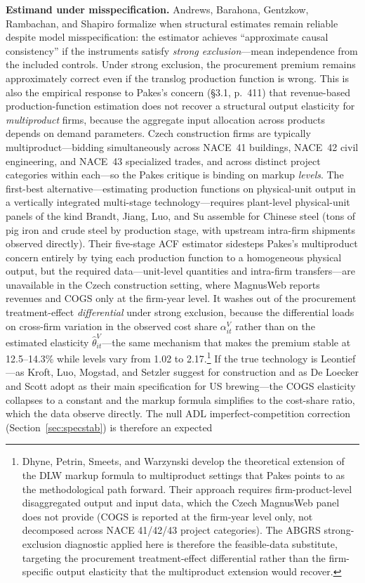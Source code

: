 \documentclass[11pt]{article}
\begin{document}
\textbf{Estimand under misspecification.} Andrews, Barahona, Gentzkow, Rambachan, and Shapiro \cite{ABGRS2025} formalize when structural estimates remain reliable despite model misspecification: the estimator achieves ``approximate causal consistency'' if the instruments satisfy \emph{strong exclusion}---mean independence from the included controls. Under strong exclusion, the procurement premium remains approximately correct even if the translog production function is wrong. This is also the empirical response to Pakes's \cite{Pakes2021AnnRev} concern (\S3.1, p.~411) that revenue-based production-function estimation does not recover a structural output elasticity for \emph{multiproduct} firms, because the aggregate input allocation across products depends on demand parameters. Czech construction firms are typically multiproduct---bidding simultaneously across NACE~41 buildings, NACE~42 civil engineering, and NACE~43 specialized trades, and across distinct project categories within each---so the Pakes critique is binding on markup \emph{levels}. The first-best alternative---estimating production functions on physical-unit output in a vertically integrated multi-stage technology---requires plant-level physical-unit panels of the kind Brandt, Jiang, Luo, and Su \cite{BrandtJiangLuoSu2022} assemble for Chinese steel (tons of pig iron and crude steel by production stage, with upstream intra-firm shipments observed directly). Their five-stage ACF estimator sidesteps Pakes's multiproduct concern entirely by tying each production function to a homogeneous physical output, but the required data---unit-level quantities and intra-firm transfers---are unavailable in the Czech construction setting, where MagnusWeb reports revenues and COGS only at the firm-year level. It washes out of the procurement treatment-effect \emph{differential} under strong exclusion, because the differential loads on cross-firm variation in the observed cost share $\alpha^V_{it}$ rather than on the estimated elasticity $\hat\theta^V_{it}$---the same mechanism that makes the premium stable at 12.5--14.3\% while levels vary from 1.02 to 2.17.\footnote{Dhyne, Petrin, Smeets, and Warzynski \cite{DhynePetrinSmeetsWarzynski2020} develop the theoretical extension of the DLW markup formula to multiproduct settings that Pakes \cite{Pakes2021AnnRev} points to as the methodological path forward. Their approach requires firm-product-level disaggregated output and input data, which the Czech MagnusWeb panel does not provide (COGS is reported at the firm-year level only, not decomposed across NACE 41/42/43 project categories). The ABGRS strong-exclusion diagnostic applied here is therefore the feasible-data substitute, targeting the procurement treatment-effect differential rather than the firm-specific output elasticity that the multiproduct extension would recover.} If the true technology is Leontief---as Kroft, Luo, Mogstad, and Setzler \cite{KLMS2025} suggest for construction and as De Loecker and Scott \cite{DeLoeckerScott2025} adopt as their main specification for US brewing---the COGS elasticity collapses to a constant and the markup formula simplifies to the cost-share ratio, which the data observe directly. The null ADL imperfect-competition correction (Section~\ref{sec:specstab}) is therefore an expected 
\end{document}
